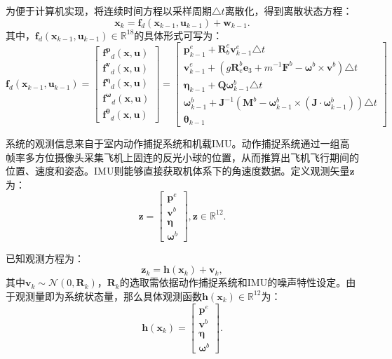 为便于计算机实现，将连续时间方程以采样周期$\triangle t$离散化，得到离散状态方程：
\begin{equation}
    \bm{x}_k = \bm{f}_d(\bm{x}_{k-1}, \bm{u}_{k-1}) + \bm{w}_{k-1}.
\end{equation}
其中，$\bm{f}_d(\bm{x}_{k-1}, \bm{u}_{k-1}) \in \mathbb{R}^{18}$的具体形式可写为：
\begin{equation}
    \bm{f}_d(\bm{x}_{k-1}, \bm{u}_{k-1}) = 
    \begin{bmatrix}
        \bm{f^p}_d(\bm{x}, \bm{u}) \\
        \bm{f^v}_d(\bm{x}, \bm{u}) \\
        \bm{f^{\eta}}_d(\bm{x}, \bm{u}) \\
        \bm{f^{\omega}}_d(\bm{x}, \bm{u}) \\
        \bm{f^{\theta}}_d(\bm{x}, \bm{u})
    \end{bmatrix} =
    \begin{bmatrix}
        \bm{p}_{k-1}^e + \bm{R}_b^e \bm{v}_{k-1}^e \triangle t \\
        \bm{v}_{k-1}^e + (g\bm{R}_e^b \bm{e}_{3} +  m^{-1}\bm{F}^b - \bm{\omega}^b \times \bm{v}^b) \triangle t\\
        \bm{\eta}_{k-1} + \bm{Q}\bm{\omega}_{k-1}^b \triangle t \\
        \bm{\omega}_{k-1}^b + \bm{J}^{-1}(\bm{M}^b - \bm{\omega}_{k-1}^b\times(\bm{J}\cdot\bm{\omega}_{k-1}^b)) \triangle t \\
        \bm{\theta}_{k-1}
    \end{bmatrix}
    \label{eq:f_d}
\end{equation}

系统的观测信息来自于室内动作捕捉系统和机载IMU。动作捕捉系统通过一组高帧率多方位摄像头采集飞机上固连的反光小球的位置，从而推算出飞机飞行期间的位置、速度和姿态。IMU则能够直接获取机体系下的角速度数据。定义观测矢量$\bm{z}$为：
\begin{equation}
    \bm{z} = 
    \begin{bmatrix}
        \bm{p}^e \\
        \bm{v}^b \\
        \bm{\eta} \\
        \bm{\omega}^b
    \end{bmatrix},
    \bm{z} \in \mathbb{R}^{12}.
\end{equation}

已知观测方程为：
\begin{equation}
    \bm{z}_k = \bm{h}(\bm{x}_k) + \bm{v}_k,
\end{equation}
其中$\bm{v}_k \sim \mathcal{N}(0, \bm{R}_k)$，$\bm{R}_k$的选取需依据动作捕捉系统和IMU的噪声特性设定。由于观测量即为系统状态量，那么具体观测函数$\bm{h}(\bm{x}_k) \in \mathbb{R}^{12}$为：
\begin{equation}
    \bm{h}(\bm{x}_k) = 
    \begin{bmatrix}
        \bm{p}^e \\
        \bm{v}^b \\
        \bm{\eta} \\
        \bm{\omega}^b
    \end{bmatrix}.
    \label{eq:obs}
\end{equation}

